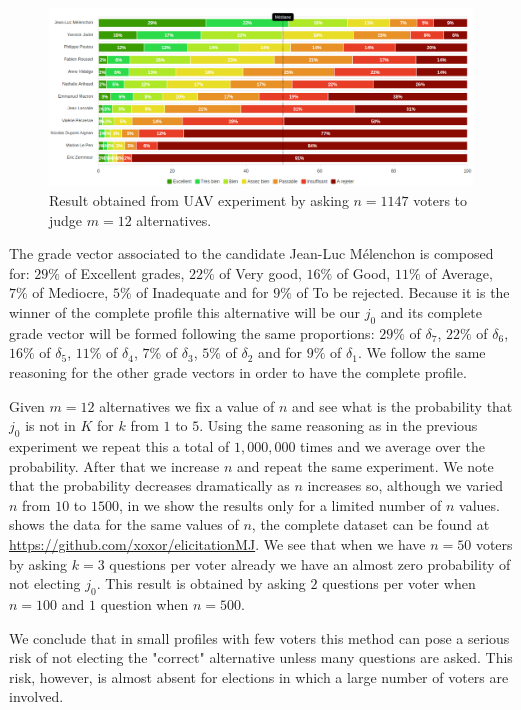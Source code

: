 	\begin{figure}
		\label{fig:distributionUAV}
		\caption{Result obtained from UAV experiment by asking $n=1147$ voters to judge $m=12$ alternatives.}
		\includegraphics[scale=0.35]{data/profileUAV}
	\end{figure}
	
	The grade vector associated to the candidate Jean-Luc Mélenchon is composed for: $29\%$ of Excellent grades, $22\%$ of Very good, $16\%$ of Good, $11\%$ of Average, $7\%$ of Mediocre, $5\%$ of Inadequate and for $9\%$ of To be rejected.
	Because it is the winner of the complete profile this alternative will be our $j_0$ and its complete grade vector will be formed following the same proportions: $29\%$ of $\delta_7$, $22\%$ of $\delta_6$, $16\%$ of $\delta_5$, $11\%$ of $\delta_4$, $7\%$ of $\delta_3$, $5\%$ of $\delta_2$ and for $9\%$ of $\delta_1$.
	We follow the same reasoning for the other grade vectors in order to have the complete profile.
	
	Given $m=12$ alternatives we fix a value of $n$ and see what is the probability that $j_0$ is not in $K$ for $k$ from $1$ to $5$. Using the same reasoning as in the previous experiment we repeat this a total of $1,000,000$ times and we average over the probability. After that we increase $n$ and repeat the same experiment. We note that the probability decreases dramatically as $n$ increases so, although we varied $n$ from $10$ to $1500$, in  we show the results only for a limited number of $n$ values.
	 shows the data for the same values of $n$, the complete dataset can be found at \url{https://github.com/xoxor/elicitationMJ}. We see that when we have $n=50$ voters by asking $k=3$ questions per voter already we have an almost zero probability of not electing $j_0$. This result is obtained by asking $2$ questions per voter when $n=100$ and $1$ question when $n=500$.
	
	We conclude that in small profiles with few voters this method can pose a serious risk of not electing the "correct" alternative unless many questions are asked. This risk, however, is almost absent for elections in which a large number of voters are involved. 
	
